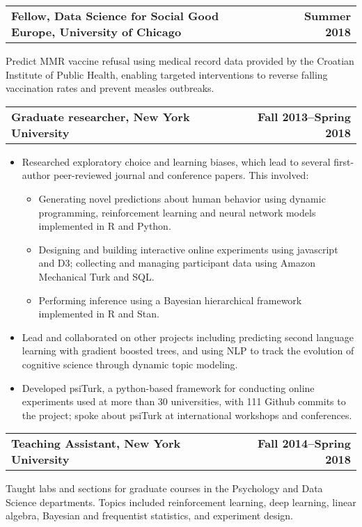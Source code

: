 \documentclass[10pt]{resume}
\begin{document}
\begin{addmargin}[1em]{0em}
\begin{tabular}{@{} L M R}
  \textbf{Fellow, Data Science for Social Good Europe, University of Chicago}& &\textbf{Summer 2018}\\
\end{tabular}\vspace{-1em}
Predict MMR vaccine refusal using medical record data provided by the Croatian
Institute of Public Health, enabling targeted
interventions to reverse falling vaccination rates and prevent measles outbreaks.

\begin{tabular}{@{} L M R}
  \textbf{Graduate researcher, New York University}& &\textbf{Fall 2013--Spring 2018}\\
\end{tabular}\vspace{-1em}
\begin{itemize}[noitemsep,topsep=-10pt,leftmargin=*]
\item Researched exploratory choice and learning biases, which lead to several first-author peer-reviewed journal and conference papers. This involved:
  \begin{itemize}[noitemsep,topsep=0pt]
  \item Generating novel predictions about human behavior using dynamic programming,
    reinforcement learning and neural network models implemented in R and Python.
  \item Designing and building interactive online experiments using javascript and D3;
    collecting and managing participant data using Amazon Mechanical Turk and SQL.
  \item Performing inference using a Bayesian hierarchical framework implemented in R and Stan.
  \end{itemize}
\item Lead and collaborated on other projects including predicting second language learning
  with gradient boosted trees, and using NLP to track the evolution of cognitive
  science through dynamic topic modeling.
\item Developed psiTurk, a python-based framework for
  conducting online experiments used at more than 30 universities, with 111 Github commits to the project; spoke
  about psiTurk at international workshops and conferences.\vspace{1em}
\end{itemize}
  

\begin{tabular}{@{} L M R}
  \textbf{Teaching Assistant, New York University}& &\textbf{Fall 2014--Spring 2018}\\
\end{tabular}\vspace{-1em}
  Taught labs and sections for graduate courses in the Psychology and
  Data Science departments. Topics included reinforcement learning, deep learning, linear algebra, Bayesian
  and frequentist statistics, and experiment design.


\end{addmargin}
\end{document}
